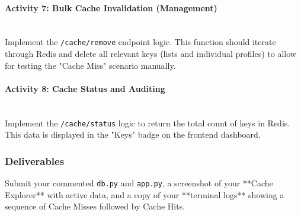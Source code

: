 \paragraph{Activity 7: Bulk Cache Invalidation (Management)}~\\
Implement the \texttt{/cache/remove} endpoint logic. This function should iterate through Redis and delete all relevant keys (lists and individual profiles) to allow for testing the "Cache Miss" scenario manually.

\paragraph{Activity 8: Cache Status and Auditing}~\\
Implement the \texttt{/cache/status} logic to return the total count of keys in Redis. This data is displayed in the "Keys" badge on the frontend dashboard.

\subsubsection{Deliverables}
Submit your commented \texttt{db.py} and \texttt{app.py}, a screenshot of your **Cache Explorer** with active data, and a copy of your **terminal logs** showing a sequence of Cache Misses followed by Cache Hits.
